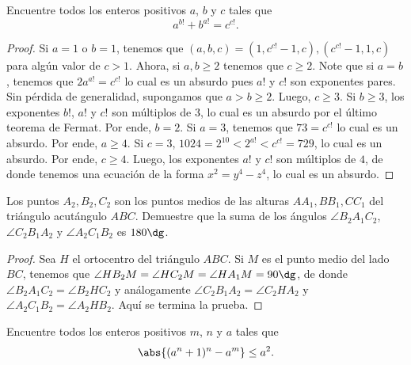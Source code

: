 \begin{probEG}
	Encuentre todos los enteros positivos $a$, $b$ y $c$ tales que
	\[a^{b!}+b^{a!}=c^{c!}.\]
\end{probEG}

\begin{proof}
	Si $a=1$ o $b=1$, tenemos que $(a,b,c)=\left(1,c^{c!}-1,c\right),\left(c^{c!}-1,1,c\right)$ para algún valor de $c>1$. Ahora, si $a,b\ge 2$ tenemos que $c\ge 2$. Note que si $a=b$, tenemos que $2a^{a!}=c^{c!}$ lo cual es un absurdo pues $a!$ y $c!$ son exponentes pares. Sin pérdida de generalidad, supongamos que $a>b\ge 2$. Luego, $c\ge 3$. Si $b\ge 3$, los exponentes $b!$, $a!$ y $c!$ son múltiplos de $3$, lo cual es un absurdo por el último teorema de Fermat. Por ende, $b=2$. Si $a=3$, tenemos que $73=c^{c!}$ lo cual es un absurdo. Por ende, $a\ge 4$. Si $c=3$, $1024=2^{10}<2^{a!}<c^{c!}=729$, lo cual es un absurdo. Por ende, $c\ge 4$. Luego, los exponentes $a!$ y $c!$ son múltiplos de $4$, de donde tenemos una ecuación de la forma $x^2=y^4-z^4$, lo cual es un absurdo.
\end{proof}

\begin{probEG}
	Los puntos $A_2,B_2,C_2$ son los puntos medios de las alturas $AA_1,BB_1,CC_1$ del triángulo acutángulo $ABC$. Demuestre que la suma de los ángulos $\angle B_2A_1C_2$, $\angle C_2B_1A_2$ y $\angle A_2C_1B_2$ es $180\dg$.
\end{probEG}

\begin{proof}
	Sea $H$ el ortocentro del triángulo $ABC$. Si $M$ es el punto medio del lado $BC$, tenemos que $\angle HB_2M=\angle HC_2M=\angle HA_1M=90\dg$, de donde $\angle B_2A_1C_2=\angle B_2HC_2$ y análogamente $\angle C_2B_1A_2=\angle C_2HA_2$ y $\angle A_2C_1B_2=\angle A_2HB_2$. Aquí se termina la prueba.
\end{proof}

\begin{probMB}
	Encuentre todos los enteros positivos $m$, $n$ y $a$ tales que
	\[\abs{(a^n+1)^n-a^m}\le a^2.\]
\end{probMB}

